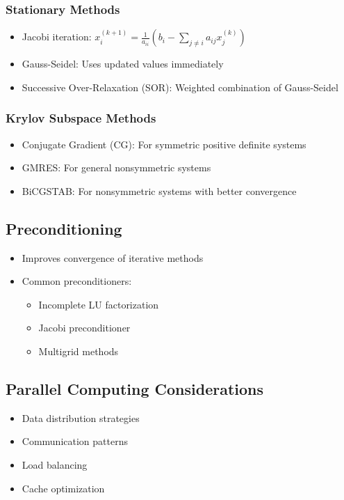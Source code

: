 \subsubsection{Stationary Methods}
\begin{itemize}
    \item Jacobi iteration: $x_i^{(k+1)} = \frac{1}{a_{ii}} \left(b_i - \sum_{j \neq i} a_{ij} x_j^{(k)}\right)$
    \item Gauss-Seidel: Uses updated values immediately
    \item Successive Over-Relaxation (SOR): Weighted combination of Gauss-Seidel
\end{itemize}

\subsubsection{Krylov Subspace Methods}
\begin{itemize}
    \item Conjugate Gradient (CG): For symmetric positive definite systems
    \item GMRES: For general nonsymmetric systems
    \item BiCGSTAB: For nonsymmetric systems with better convergence
\end{itemize}

\subsection{Preconditioning}
\begin{itemize}
    \item Improves convergence of iterative methods
    \item Common preconditioners:
        \begin{itemize}
            \item Incomplete LU factorization
            \item Jacobi preconditioner
            \item Multigrid methods
        \end{itemize}
\end{itemize}

\subsection{Parallel Computing Considerations}
\begin{itemize}
    \item Data distribution strategies
    \item Communication patterns
    \item Load balancing
    \item Cache optimization
\end{itemize} 